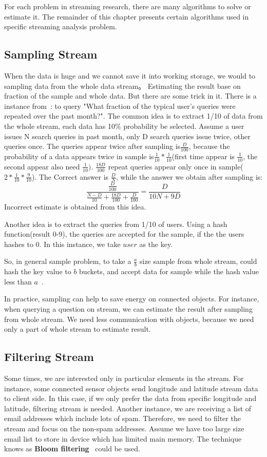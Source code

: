 For each problem in streaming research, there are many algorithms to solve or
estimate it. The remainder of this chapter presents certain algorithms used in
specific streaming analysis problem.

\subsection{Sampling Stream}

When the data is huge and we cannot save it into working storage, we would to
sampling data from the whole data stream。 Estimating the result base on fraction
of the sample and whole data. But there are some trick in it. There is a
instance from~\cite{leskovec2014mining}: to query "What fraction of the typical
user's queries were repeated over the past month?". The common idea is to
extract 1/10 of data from the whole stream, each data has 10\% probability be
selected. Assume a user issues N search queries in past month, only D search
queries issue twice, other queries once. The queries appear twice after sampling
is$\frac{D}{100}$, because the probability of a data appears twice in sample
is$\frac{1}{10}*\frac{1}{10}$(first time appear is $\frac{1}{10}$, the second
appear also need $\frac{1}{10})$. $\frac{18D}{100}$ repeat queries appear only
once in sample($2*\frac{1}{10}*\frac{9}{10}$). The Correct answer is
$\frac{D}{N}$, while the answer we obtain after sampling is:
\begin{equation*}
    \frac{\frac{D}{100}}{\frac{N-D}{10}+\frac{18D}{100}+\frac{D}{100}} = \frac{D}{10N+9D}
\end{equation*}
Incorrect estimate is obtained from this idea.


Another idea is to extract the queries from 1/10 of users. Using a hash
function(result 0-9), the queries are accepted for the sample, if the the users
hashes to 0. In this instance, we take $user$ as the key. 

So, in general sample problem, to take a $\frac{a}{b}$ size sample from whole
stream, could hash the key value to $b$ buckets, and accept data for sample
while the hash value less than $a$~\cite{leskovec2014mining}.

In practice, sampling can help to save energy on connected objects. For
instance, when querying a question on stream, we can estimate the result
after sampling from whole stream. We need less communication with objects,
because we need only a part of whole stream to estimate result.  

\subsection{Filtering Stream}
Some times, we are interested only in particular elements in the stream. For
instance, some connected sensor objects send longitude and
latitude stream data to client side. In this case, if we only prefer
the data from specific longitude and latitude, filtering stream is needed.
Another instance, we are receiving a list of email addresses which include lots
of spam. Therefore, we need to filter the stream and focus on the non-spam
addresses. Assume we have too large size email list to store in device which has
limited main memory. The technique knows as \textbf{Bloom
filtering}~\cite{bloom1970space} could be used. 
